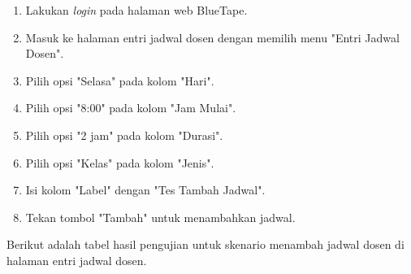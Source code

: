 \begin{enumerate}
    \item Lakukan \textit{login} pada halaman web BlueTape.
    \item Masuk ke halaman entri jadwal dosen dengan memilih menu "Entri Jadwal Dosen".
    \item Pilih opsi "Selasa" pada kolom "Hari".
    \item Pilih opsi "8:00" pada kolom "Jam Mulai".
    \item Pilih opsi "2 jam" pada kolom "Durasi".
    \item Pilih opsi "Kelas" pada kolom "Jenis".
    \item Isi kolom "Label" dengan "Tes Tambah Jadwal".
    \item Tekan tombol "Tambah" untuk menambahkan jadwal.
\end{enumerate}

Berikut adalah tabel hasil pengujian untuk skenario menambah jadwal dosen di halaman entri jadwal dosen.

